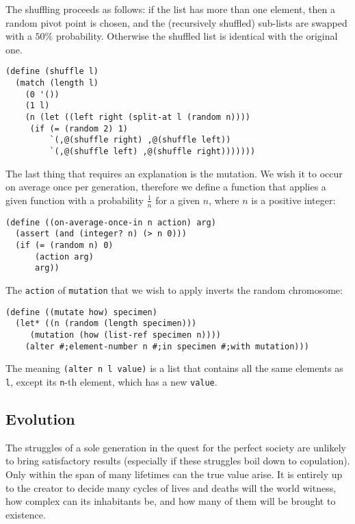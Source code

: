 The shuffling proceeds as follows: if the list has more
than one element, then a random pivot point is chosen,
and the (recursively shuffled) sub-lists are swapped with
a $50\%$ probability. Otherwise the shuffled list is
identical with the original one.

\begin{Verbatim}[samepage=true]
(define (shuffle l)
  (match (length l)
    (0 '())
    (1 l)
    (n (let ((left right (split-at l (random n))))
	 (if (= (random 2) 1)
	     `(,@(shuffle right) ,@(shuffle left))
	     `(,@(shuffle left) ,@(shuffle right)))))))
\end{Verbatim}

The last thing that requires an explanation is the mutation.
We wish it to occur on average once per generation, therefore
we define a function that applies a given function with
a probability $\frac{1}{n}$ for a given $n$, where $n$ is
a positive integer:

\begin{Verbatim}[samepage=true]
(define ((on-average-once-in n action) arg)
  (assert (and (integer? n) (> n 0)))
  (if (= (random n) 0)
      (action arg)
      arg))
\end{Verbatim}

The \texttt{action} of \texttt{mutation} that we wish to apply
inverts the random chromosome:

\begin{Verbatim}[samepage=true]
(define ((mutate how) specimen)
  (let* ((n (random (length specimen)))
	 (mutation (how (list-ref specimen n))))
    (alter #;element-number n #;in specimen #;with mutation)))
\end{Verbatim}

The meaning \texttt{(alter n l value)} is a list that contains
all the same elements as \texttt{l}, except its \texttt{n}-th
element, which has a new \texttt{value}.

\subsection{Evolution}

The struggles of a sole generation in the quest for the perfect
society are unlikely to bring satisfactory results (especially
if these struggles boil down to copulation). Only within
the span of many lifetimes can the true value arise. It is
entirely up to the creator to decide many cycles of lives
and deaths will the world witness, how complex can its inhabitants
be, and how many of them will be brought to existence.


